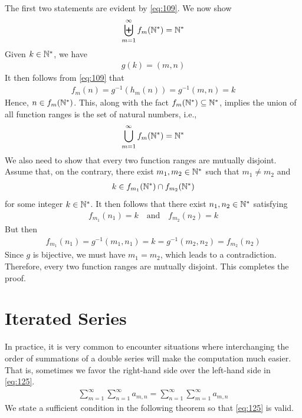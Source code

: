 \documentclass[thmcnt=section, 12pt]{my-elegantbook}
\begin{document}
\begin{solution}
    The first two statements are evident by \eqref{eq:109}. We now show
    \begin{align*}
        \biguplus_{m=1}^\infty f_m(\mathbb{N}^\ast) = \mathbb{N}^\ast
    \end{align*}
    Given $k \in \mathbb{N}^\ast$, we have
    \begin{align*}
        g(k) = (m, n)
    \end{align*}
    It then follows from \eqref{eq:109} that
    \begin{align*}
        f_m(n) = g^{-1}(h_m(n))
        = g^{-1}(m,n)
        = k
    \end{align*}
    Hence, $n \in f_m(\mathbb{N}^\ast)$. This, along with the fact $f_m(\mathbb{N}^\ast) \subseteq \mathbb{N}^\ast$, implies the union of all function ranges is the set of natural numbers, i.e.,
    \begin{align*}
        \bigcup_{m=1}^\infty f_m(\mathbb{N}^\ast) = \mathbb{N}^\ast
    \end{align*}
    We also need to show that every two function ranges are mutually disjoint. Assume that, on the contrary, there exist $m_1, m_2 \in \mathbb{N}^\ast$ such that $m_1 \neq m_2$ and
    \begin{align*}
        k \in f_{m_1}(\mathbb{N}^\ast) \cap f_{m_2}(\mathbb{N}^\ast)
    \end{align*}
    for some integer $k \in \mathbb{N}^\ast$. It then follows that there exist $n_1, n_2 \in \mathbb{N}^\ast$ satisfying
    \begin{align*}
        f_{m_1}(n_1) = k
        \quad \text{and} \quad
        f_{m_2}(n_2) = k
    \end{align*}
    But then
    \begin{align*}
        f_{m_1}(n_1)
        = g^{-1}(m_1, n_1)
        = k
        = g^{-1}(m_2, n_2)
        = f_{m_2}(n_2)
    \end{align*}
    Since $g$ is bijective, we must have $m_1 = m_2$, which leads to a contradiction. Therefore, every two function ranges are mutually disjoint. This completes the proof.
\end{solution}


\section{Iterated Series}

In practice, it is very common to encounter situations where interchanging the order of summations of a double series will make the computation much easier. That is, sometimes we favor the right-hand side over the left-hand side in \eqref{eq:125}.
\begin{align}
    \sum_{m=1}^\infty \sum_{n=1}^\infty a_{m,n}
    = \sum_{n=1}^\infty \sum_{m=1}^\infty a_{m,n}
    \label{eq:125}
\end{align}
We state a sufficient condition in the following theorem so that \eqref{eq:125} is valid.
\end{document}
